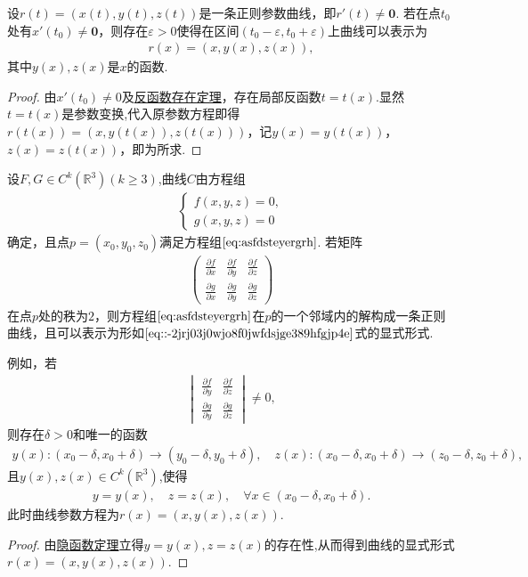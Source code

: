 \documentclass[../../main.tex]{subfiles}%
\begin{document}
\begin{theorem}[正则参数曲线的显式形式]
设$r(t)=(x(t),y(t),z(t))$是一条正则参数曲线，即$r'(t)\neq \bm{0}$. 若在点$t_0$处有$x'(t_0)\neq \bm{0}$，则存在$\varepsilon>0$使得在区间$(t_0-\varepsilon,t_0+\varepsilon)$上曲线可以表示为
\begin{align}\label{eq::-2jrj03j0wjo8f0jwfdsjge389hfgjp4e}
r(x)=(x,y(x),z(x)),
\end{align}
其中$y(x),z(x)$是$x$的函数.
\end{theorem}
\begin{proof}
由$x'(t_0)\neq 0$及\hyperref[Basis of Analytics-theorem:反函数存在定理]{反函数存在定理}，存在局部反函数$t=t(x)$.显然$t=t(x)$是参数变换,代入原参数方程即得$r(t(x))=(x,y(t(x)),z(t(x)))$，记$y(x)=y(t(x))$，$z(x)=z(t(x))$，即为所求.
\end{proof}

\begin{theorem}[正则参数曲线的隐式形式]
设$F,G\in C^k(\mathbb{R}^3)(k\geqslant 3)$,曲线$C$由方程组
\begin{gather}\label{eq:asfdsteyergrh}
\begin{cases}
f(x,y,z)=0,\\
g(x,y,z)=0
\end{cases}
\end{gather}
确定，且点$p=(x_0,y_0,z_0)$满足方程组$\eqref{eq:asfdsteyergrh}$. 若矩阵
\begin{align*}
\begin{pmatrix}
\frac{\partial f}{\partial x} & \frac{\partial f}{\partial y} & \frac{\partial f}{\partial z}\\[2mm]
\frac{\partial g}{\partial x} & \frac{\partial g}{\partial y} & \frac{\partial g}{\partial z}
\end{pmatrix}
\end{align*}
在点$p$处的秩为$2$，则方程组$\eqref{eq:asfdsteyergrh}$在$p$的一个邻域内的解构成一条正则曲线，且可以表示为形如$\eqref{eq::-2jrj03j0wjo8f0jwfdsjge389hfgjp4e}$式的显式形式.

例如，若
\begin{align*}
\begin{vmatrix}
\frac{\partial f}{\partial y} & \frac{\partial f}{\partial z}\\[2mm]
\frac{\partial g}{\partial y} & \frac{\partial g}{\partial z}
\end{vmatrix}\neq 0,
\end{align*}
则存在$\delta>0$和唯一的函数
\begin{align*}
y(x):(x_0-\delta ,x_0+\delta )\rightarrow (y_0-\delta ,y_0+\delta ),
\quad z(x):(x_0-\delta ,x_0+\delta )\rightarrow (z_0-\delta ,z_0+\delta ),
\end{align*}
且$y(x),z(x)\in C^k(\mathbb{R}^3)$,使得
\begin{align*}
y=y(x),\quad z=z(x),\quad \forall x\in (x_0-\delta,x_0+\delta).
\end{align*}
此时曲线参数方程为$r(x)=(x,y(x),z(x))$. 
\end{theorem}
\begin{proof}
由\hyperref[Basis of Analytics-theorem:隐函数组定理多变量一般形式]{隐函数定理}立得$y=y(x),z=z(x)$的存在性,从而得到曲线的显式形式$r(x)=(x,y(x),z(x))$. 
\end{proof}
\end{document}
